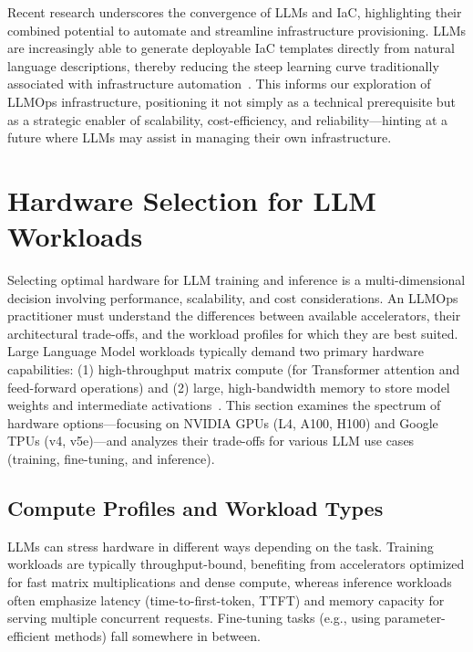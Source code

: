 Recent research underscores the convergence of LLMs and IaC, highlighting their combined potential to automate and streamline infrastructure provisioning.
LLMs are increasingly able to generate deployable IaC templates directly from natural language descriptions, thereby reducing the steep learning curve traditionally associated with infrastructure automation~\cite{srivatsa2024-iac-llm}.
This informs our exploration of LLMOps infrastructure, positioning it not simply as a technical prerequisite but as a strategic enabler of scalability, cost-efficiency, and reliability—hinting at a future where LLMs may assist in managing their own infrastructure.

\section{Hardware Selection for LLM Workloads}
\label{sec:infra-hardware-bench}
Selecting optimal hardware for LLM training and inference is a multi-dimensional decision involving performance, scalability, and cost considerations. 
An LLMOps practitioner must understand the differences between available accelerators, their architectural trade-offs, and the workload profiles for which they are best suited. 
Large Language Model workloads typically demand two primary hardware capabilities: (1) high-throughput matrix compute (for Transformer attention and feed-forward operations) and (2) large, high-bandwidth memory to store model weights and intermediate activations~\cite{nvidia-h100-arch,nvidia-a100-arch,jouppi2023-tpuv4}. 
This section examines the spectrum of hardware options—focusing on NVIDIA GPUs (L4, A100, H100) and Google TPUs (v4, v5e)—and analyzes their trade-offs for various LLM use cases (training, fine-tuning, and inference).

\subsection{Compute Profiles and Workload Types}
\label{sec:infra-hardware-profiles}

LLMs can stress hardware in different ways depending on the task. Training workloads are typically throughput-bound, benefiting from accelerators optimized for fast matrix multiplications and dense compute, whereas inference workloads often emphasize latency (time-to-first-token, TTFT) and memory capacity for serving multiple concurrent requests. Fine-tuning tasks (e.g., using parameter-efficient methods) fall somewhere in between.

